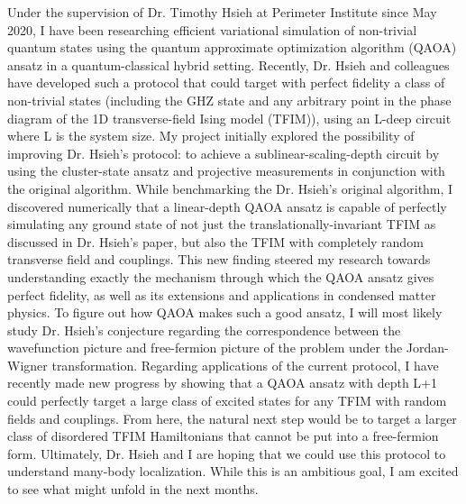 \documentclass[12pt]{article}
\begin{document}
Under the supervision of Dr. Timothy Hsieh at Perimeter Institute since May 2020, I have been researching efficient variational simulation of non-trivial quantum states using the quantum approximate optimization algorithm (QAOA) ansatz in a quantum-classical hybrid setting. Recently, Dr. Hsieh and colleagues have developed such a protocol that could target with perfect fidelity a class of non-trivial states (including the GHZ state and any arbitrary point in the phase diagram of the 1D transverse-field Ising model (TFIM)), using an L-deep circuit where L is the system size. My project initially explored the possibility of improving Dr. Hsieh's protocol: to achieve a sublinear-scaling-depth circuit by using the cluster-state ansatz and projective measurements in conjunction with the original algorithm. While benchmarking the Dr. Hsieh's original algorithm, I discovered numerically that a linear-depth QAOA ansatz is capable of perfectly simulating any ground state of not just the translationally-invariant TFIM as discussed in Dr. Hsieh's paper, but also the TFIM with completely random transverse field and couplings. This new finding steered my research towards understanding exactly the mechanism through which the QAOA ansatz gives perfect fidelity, as well as its extensions and applications in condensed matter physics. To figure out how QAOA makes such a good ansatz, I will most likely study Dr. Hsieh's conjecture regarding the correspondence between the wavefunction picture and free-fermion picture of the problem under the Jordan-Wigner transformation. Regarding applications of the current protocol, I have recently made new progress by showing that a QAOA ansatz with depth L+1 could perfectly target a large class of excited states for any TFIM with random fields and couplings. From here, the natural next step would be to target a larger class of disordered TFIM Hamiltonians that cannot be put into a free-fermion form. Ultimately, Dr. Hsieh and I are hoping that we could use this protocol to understand many-body localization. While this is an ambitious goal, I am excited to see what might unfold in the next months. \\ \vspace{-9pt}
\end{document}
